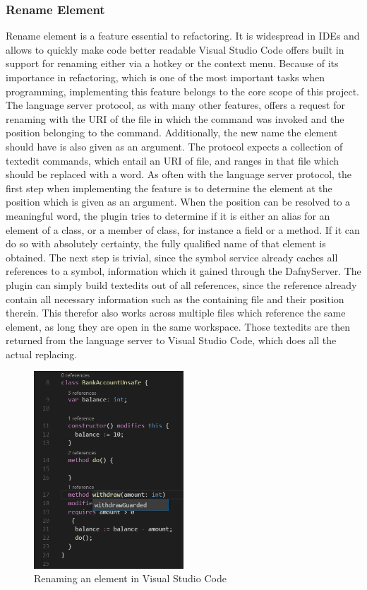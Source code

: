 \subsubsection{Rename Element} \label{renameelement}
Rename element is a feature essential to refactoring. It is widespread in IDEs and allows to quickly make code better readable Visual Studio Code offers built in support for renaming either via a hotkey or the context menu. \newline
Because of its importance in refactoring, which is one of the most important tasks when programming, implementing this feature belongs to the core scope of this project. \newline
The language server protocol, as with many other features, offers a request for renaming with the URI of the file in which the command was invoked and the position belonging to the command. Additionally, the new name the element should have is also given as an argument. The protocol expects a collection of textedit commands, which entail an URI of file, and ranges in that file which should be replaced with a word. \newline
As often with the language server protocol, the first step when implementing the feature is to determine the element at the position which is given as an argument. When the position can be resolved to a meaningful word, the plugin tries to determine if it is either an alias for an element of a class, or a member of class, for instance a field or a method. If it can do so with absolutely certainty, the fully qualified name of that element is obtained. The next step is trivial, since the symbol service already caches all references to a symbol, information which it gained through the DafnyServer. The plugin can simply build textedits out of all references, since the reference already contain all necessary information such as the containing file and their position therein. This therefor also works across multiple files which reference the same element, as long they are open in the same workspace. Those textedits are then returned from the language server to Visual Studio Code, which does all the actual replacing. \newline
  \begin{figure}[H]
 	\centering
 	\includegraphics[width=0.5\textwidth]{img/rename}
 	\caption{Renaming an element in Visual Studio Code}
 	\label{fig:rename}
 \end{figure}
